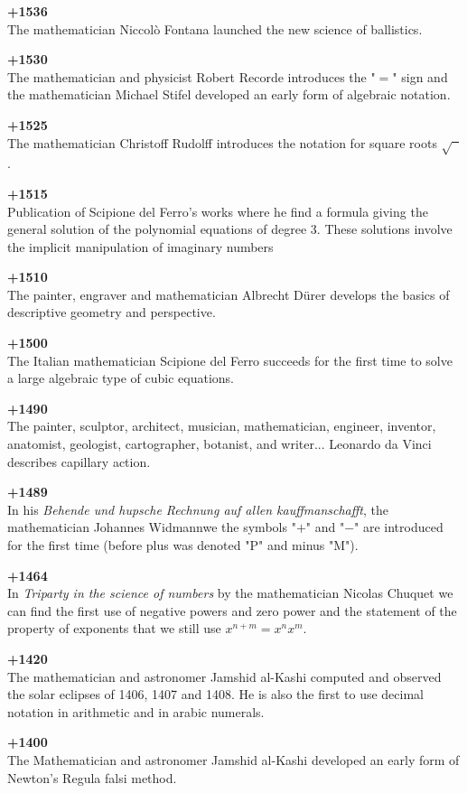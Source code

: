 \textbf{+1536}\\
The mathematician Niccolò Fontana launched the new science of ballistics.

\textbf{+1530}\\
The mathematician and physicist Robert Recorde introduces the "$=$" sign and the mathematician Michael Stifel developed an early form of algebraic notation.

\textbf{+1525}\\
The mathematician Christoff Rudolff introduces the notation for square roots $\sqrt{\phantom{a}}$.

\textbf{+1515}\\
Publication of Scipione del Ferro's works where he find a formula giving the general solution of the polynomial equations of degree $3$. These solutions involve the implicit manipulation of imaginary numbers

\textbf{+1510}\\
The painter, engraver and mathematician Albrecht Dürer develops the basics of descriptive geometry and perspective.

\textbf{+1500}\\
The Italian mathematician Scipione del Ferro succeeds for the first time to solve a large algebraic type of cubic equations.

\textbf{+1490}\\
The painter, sculptor, architect, musician, mathematician, engineer, inventor, anatomist, geologist, cartographer, botanist, and writer... Leonardo da Vinci describes capillary action.

\textbf{+1489}\\
In his \textit{Behende und hupsche Rechnung auf allen kauffmanschafft}, the mathematician Johannes Widmannwe the symbols "$+$" and "$-$" are introduced for the first time (before plus was denoted "P" and minus "M").

\textbf{+1464}\\
In \textit{Triparty in the science of numbers} by the mathematician Nicolas Chuquet we can find the first use of negative powers and zero power and the statement of the property of exponents that we still use $x^{n+m}=x^nx^m$.

\textbf{+1420}\\
The mathematician and astronomer Jamshid al-Kashi computed and observed the solar eclipses of 1406, 1407 and 1408. He is also the first to use decimal notation in arithmetic and in arabic numerals.

\textbf{+1400}\\
The Mathematician and astronomer Jamshid al-Kashi developed an early form of Newton's Regula falsi method.

